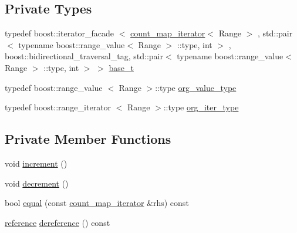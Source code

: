 \subsection*{\-Private \-Types}
\begin{DoxyCompactItemize}
\item 
typedef boost\-::iterator\-\_\-facade\*
$<$ \hyperlink{classyuh_1_1range__detail_1_1count__map__iterator}{count\-\_\-map\-\_\-iterator}$<$ \-Range $>$\*
, std\-::pair$<$ typename \*
boost\-::range\-\_\-value$<$ \-Range $>$\*
\-::type, int $>$\*
, boost\-::bidirectional\-\_\-traversal\-\_\-tag, \*
std\-::pair$<$ typename \*
boost\-::range\-\_\-value$<$ \-Range $>$\*
\-::type, int $>$ $>$ \hyperlink{classyuh_1_1range__detail_1_1count__map__iterator_abca93b0083606f7327745d6baae94316}{base\-\_\-t}
\item 
typedef boost\-::range\-\_\-value\*
$<$ \-Range $>$\-::type \hyperlink{classyuh_1_1range__detail_1_1count__map__iterator_a69559cacbf423e64c6efb8e1644ea37e}{org\-\_\-value\-\_\-type}
\item 
typedef boost\-::range\-\_\-iterator\*
$<$ \-Range $>$\-::type \hyperlink{classyuh_1_1range__detail_1_1count__map__iterator_a7d85ad9a5f85d7a869dd7ea9557eee8b}{org\-\_\-iter\-\_\-type}
\end{DoxyCompactItemize}
\subsection*{\-Private \-Member \-Functions}
\begin{DoxyCompactItemize}
\item 
void \hyperlink{classyuh_1_1range__detail_1_1count__map__iterator_aeb2624c7a86b765725fd80cd426e147d}{increment} ()
\item 
void \hyperlink{classyuh_1_1range__detail_1_1count__map__iterator_af998f1201f6ff5160003144e5818b8ba}{decrement} ()
\item 
bool \hyperlink{classyuh_1_1range__detail_1_1count__map__iterator_a2813587a105bbce5a2ff967c06449e06}{equal} (const \hyperlink{classyuh_1_1range__detail_1_1count__map__iterator}{count\-\_\-map\-\_\-iterator} \&rhs) const 
\item 
\hyperlink{classyuh_1_1range__detail_1_1count__map__iterator_aa5d67140d1557795cc6c30a2849d4e05}{reference} \hyperlink{classyuh_1_1range__detail_1_1count__map__iterator_a1b739c629ff6d9f19e13216adc65a999}{dereference} () const 
\end{DoxyCompactItemize}
